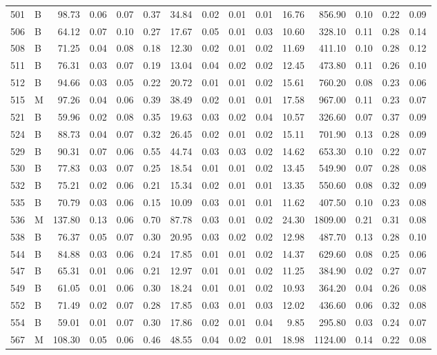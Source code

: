 \begin{table}[ht]
\begin{tabular}{rlrrrrrrrrrrrrr}
  501 & B & 98.73 & 0.06 & 0.07 & 0.37 & 34.84 & 0.02 & 0.01 & 0.01 & 16.76 & 856.90 & 0.10 & 0.22 & 0.09 \\ 
  506 & B & 64.12 & 0.07 & 0.10 & 0.27 & 17.67 & 0.05 & 0.01 & 0.03 & 10.60 & 328.10 & 0.11 & 0.28 & 0.14 \\ 
  508 & B & 71.25 & 0.04 & 0.08 & 0.18 & 12.30 & 0.02 & 0.01 & 0.02 & 11.69 & 411.10 & 0.10 & 0.28 & 0.12 \\ 
  511 & B & 76.31 & 0.03 & 0.07 & 0.19 & 13.04 & 0.04 & 0.02 & 0.02 & 12.45 & 473.80 & 0.11 & 0.26 & 0.10 \\ 
  512 & B & 94.66 & 0.03 & 0.05 & 0.22 & 20.72 & 0.01 & 0.01 & 0.02 & 15.61 & 760.20 & 0.08 & 0.23 & 0.06 \\ 
  515 & M & 97.26 & 0.04 & 0.06 & 0.39 & 38.49 & 0.02 & 0.01 & 0.01 & 17.58 & 967.00 & 0.11 & 0.23 & 0.07 \\ 
  521 & B & 59.96 & 0.02 & 0.08 & 0.35 & 19.63 & 0.03 & 0.02 & 0.04 & 10.57 & 326.60 & 0.07 & 0.37 & 0.09 \\ 
  524 & B & 88.73 & 0.04 & 0.07 & 0.32 & 26.45 & 0.02 & 0.01 & 0.02 & 15.11 & 701.90 & 0.13 & 0.28 & 0.09 \\ 
  529 & B & 90.31 & 0.07 & 0.06 & 0.55 & 44.74 & 0.03 & 0.03 & 0.02 & 14.62 & 653.30 & 0.10 & 0.22 & 0.07 \\ 
  530 & B & 77.83 & 0.03 & 0.07 & 0.25 & 18.54 & 0.01 & 0.01 & 0.02 & 13.45 & 549.90 & 0.07 & 0.28 & 0.08 \\ 
  532 & B & 75.21 & 0.02 & 0.06 & 0.21 & 15.34 & 0.02 & 0.01 & 0.01 & 13.35 & 550.60 & 0.08 & 0.32 & 0.09 \\ 
  535 & B & 70.79 & 0.03 & 0.06 & 0.15 & 10.09 & 0.03 & 0.01 & 0.01 & 11.62 & 407.50 & 0.10 & 0.23 & 0.08 \\ 
  536 & M & 137.80 & 0.13 & 0.06 & 0.70 & 87.78 & 0.03 & 0.01 & 0.02 & 24.30 & 1809.00 & 0.21 & 0.31 & 0.08 \\ 
  538 & B & 76.37 & 0.05 & 0.07 & 0.30 & 20.95 & 0.03 & 0.02 & 0.02 & 12.98 & 487.70 & 0.13 & 0.28 & 0.10 \\ 
  544 & B & 84.88 & 0.03 & 0.06 & 0.24 & 17.85 & 0.01 & 0.01 & 0.02 & 14.37 & 629.60 & 0.08 & 0.25 & 0.06 \\ 
  547 & B & 65.31 & 0.01 & 0.06 & 0.21 & 12.97 & 0.01 & 0.01 & 0.02 & 11.25 & 384.90 & 0.02 & 0.27 & 0.07 \\ 
  549 & B & 61.05 & 0.01 & 0.06 & 0.30 & 18.24 & 0.01 & 0.01 & 0.02 & 10.93 & 364.20 & 0.04 & 0.26 & 0.08 \\ 
  552 & B & 71.49 & 0.02 & 0.07 & 0.28 & 17.85 & 0.03 & 0.01 & 0.03 & 12.02 & 436.60 & 0.06 & 0.32 & 0.08 \\ 
  554 & B & 59.01 & 0.01 & 0.07 & 0.30 & 17.86 & 0.02 & 0.01 & 0.04 & 9.85 & 295.80 & 0.03 & 0.24 & 0.07 \\ 
  567 & M & 108.30 & 0.05 & 0.06 & 0.46 & 48.55 & 0.04 & 0.02 & 0.01 & 18.98 & 1124.00 & 0.14 & 0.22 & 0.08 \\ 
   \hline
\end{tabular}
\end{table}
